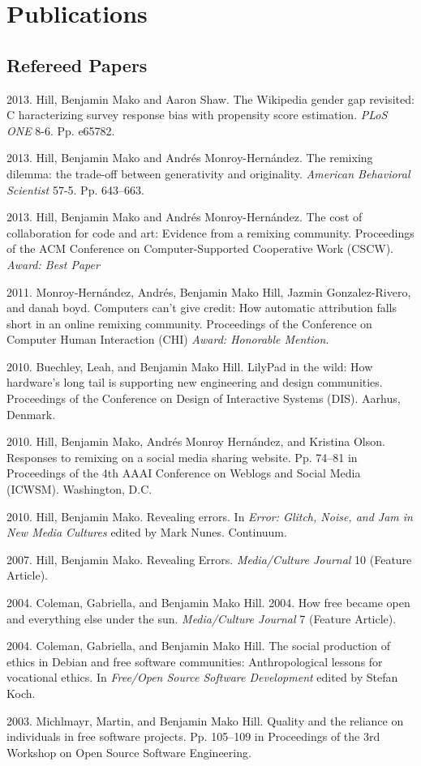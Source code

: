 \documentclass[10pt]{article}
\newenvironment{cvlist}{
\begin{list}{}{\leftmargin=3.0em \itemindent=-3.0em}
  \setlength{\itemsep}{0pt}
  \setlength{\parskip}{0em}
  \setlength{\parsep}{1em}
  \setlength{\parindent}{0em}}
{\vspace{1em}
\end{list}}
\begin{document}
\section{Publications}

\subsection{Refereed Papers}
\begin{cvlist}
\item 2013. Hill, Benjamin Mako and Aaron Shaw. The Wikipedia gender gap revisited: C
haracterizing survey response bias with propensity score estimation. \emph{PLoS ONE} 8-6. Pp. e65782.
\item 2013. Hill, Benjamin Mako and Andrés Monroy-Hernández. The remixing dilemma: the trade-off between generativity and originality. \emph{American Behavioral Scientist} 57-5. Pp. 643--663.
\item 2013. Hill, Benjamin Mako and Andrés Monroy-Hernández. The cost of collaboration for code and art: Evidence from a remixing community.  Proceedings of the ACM Conference on Computer-Supported Cooperative Work (CSCW). \emph{Award: Best Paper}
\item 2011. Monroy-Hernández, Andrés, Benjamin Mako Hill, Jazmin Gonzalez-Rivero, and danah boyd. Computers can't give credit: How automatic attribution falls short in an online remixing community. Proceedings of the Conference on Computer Human Interaction (CHI) \emph{Award: Honorable Mention}.
\item 2010. Buechley, Leah, and Benjamin Mako Hill. LilyPad in the wild: How hardware's long tail is supporting new engineering and design communities. Proceedings of the Conference on Design of Interactive Systems (DIS). Aarhus, Denmark.
\item 2010. Hill, Benjamin Mako, Andrés Monroy Hernández, and Kristina Olson. Responses to remixing on a social media sharing website. Pp. 74--81 in Proceedings of the 4th AAAI Conference on Weblogs and Social Media (ICWSM). Washington, D.C.
\item 2010. Hill, Benjamin Mako. Revealing errors. In \emph{Error:
    Glitch, Noise, and Jam in New Media Cultures} edited by Mark Nunes. Continuum. %
\item 2007. Hill, Benjamin Mako. Revealing Errors. \emph{Media/Culture Journal} 10 (Feature Article).
\item 2004. Coleman, Gabriella, and Benjamin Mako Hill. 2004. How free became open and everything else under the sun. \emph{Media/Culture Journal} 7 (Feature Article).
\item 2004. Coleman, Gabriella, and Benjamin Mako Hill. The social production of ethics in Debian and free software communities: Anthropological lessons for vocational ethics. In \emph{Free/Open Source Software Development} edited by Stefan Koch.
\item 2003. Michlmayr, Martin, and Benjamin Mako Hill. Quality and the reliance on individuals in free software projects. Pp. 105--109 in Proceedings of the 3rd Workshop on Open Source Software Engineering.
\end{cvlist}
\end{document}
